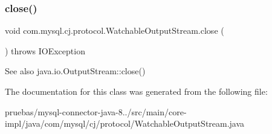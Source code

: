 \subsubsection{\texorpdfstring{close()}{close()}}
{\footnotesize\ttfamily void com.\+mysql.\+cj.\+protocol.\+Watchable\+Output\+Stream.\+close (\begin{DoxyParamCaption}{ }\end{DoxyParamCaption}) throws I\+O\+Exception}

\begin{DoxySeeAlso}{See also}
java.\+io.\+Output\+Stream\+::close() 
\end{DoxySeeAlso}


The documentation for this class was generated from the following file\+:\begin{DoxyCompactItemize}
\item 
pruebas/mysql-\/connector-\/java-\/8../src/main/core-\/impl/java/com/mysql/cj/protocol/Watchable\+Output\+Stream.\+java\end{DoxyCompactItemize}
